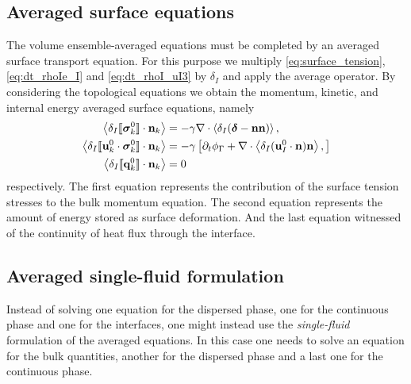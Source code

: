 \subsection{Averaged surface equations}
The volume ensemble-averaged equations must be completed by an averaged surface transport equation.  
For this purpose we multiply \ref{eq:surface_tension}, \ref{eq:dt_rhoIe_I} and \ref{eq:dt_rhoI_uI3} by $\delta_I$ and apply the average operator.
By considering the topological equations we obtain the  momentum, kinetic, and internal energy averaged surface equations, namely
\begin{align}
    \label{eq:dt_avg_uI}
    \avg{\delta_I \Jump{\bm{\sigma}^0_k}}
    &= -\gamma \div \avg{\delta_I (\bm\delta - \textbf{nn})},\\
    \label{eq:dt_avg_gamma}
    \avg{\delta_I \Jump{\textbf{u}_k^0 \cdot \bm{\sigma}^0_k}}
    &= - \gamma \left[
        \pddt \phi_\Gamma
        +  \div \avg{\delta_I (\textbf{u}_{I}^0 \cdot \textbf{n})\textbf{n} },
    \right]\\
    \avg{\delta_I \Jump{\textbf{q}^0_k}}
    &= 0
\end{align}
respectively. 
The first equation represents the contribution of the surface tension stresses to the bulk momentum equation.
The second equation represents the amount of energy stored as surface deformation.
And the last equation witnessed of the continuity of heat flux through the interface. 

\subsection{Averaged single-fluid formulation}
Instead of solving one equation for the dispersed phase, one for the continuous phase and one for the interfaces, one might instead use the \textit{single-fluid} formulation of the averaged equations. 
In this case one needs to solve an equation for the bulk quantities, another for the dispersed phase and a last one for the continuous phase. 


